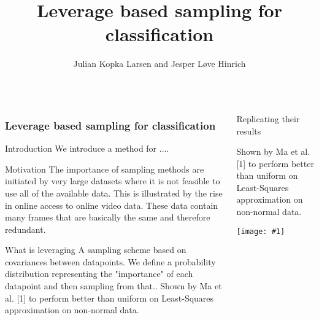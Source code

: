 \documentclass{beamer}
\title{Leverage based sampling for classification }
\author{Julian Kopka Larsen and Jesper Løve Hinrich}
\institute{DTU Compute}
\newenvironment{pblock}{\begin{minipage}[b]{\linewidth}
	\begin{block}}{\end{block} 	\end{minipage}}
\newcommand{\imblock}[1]{
\texttt{[image: \#1]}}
\begin{document}
\begin{columns}[t]
    \begin{column}{.3\linewidth}


	\frametitle{Leverage based sampling for classification}
	

	\begin{pblock}{Introduction}
	We introduce a method for ....
	\end{pblock}
	
	\begin{pblock}{Motivation}
	The importance of sampling methods are initiated by very large datasets where it is not feasible to use all of the available data. This is illustrated by the rise in online access to online video data. These data contain many frames that are basically the same and therefore redundant. 
	\end{pblock}
	\begin{pblock}{What is leveraging}
	A sampling scheme based on covariances between datapoints. We define a probability distribution representing the "importance" of each datapoint and then sampling from that..  
	Shown by Ma et al. [1] to perform better than uniform on Least-Squares approximation on non-normal data.
	\end{pblock}
	    \end{column}
    \begin{column}{.3\linewidth}


	\begin{pblock}{Replicating their results}

	Shown by Ma et al. [1] to perform better than uniform on Least-Squares approximation on non-normal data.
	\end{pblock}
	
	\imblock{../T1.png}
	
	
    \end{column}
  \end{columns}
\end{document}
